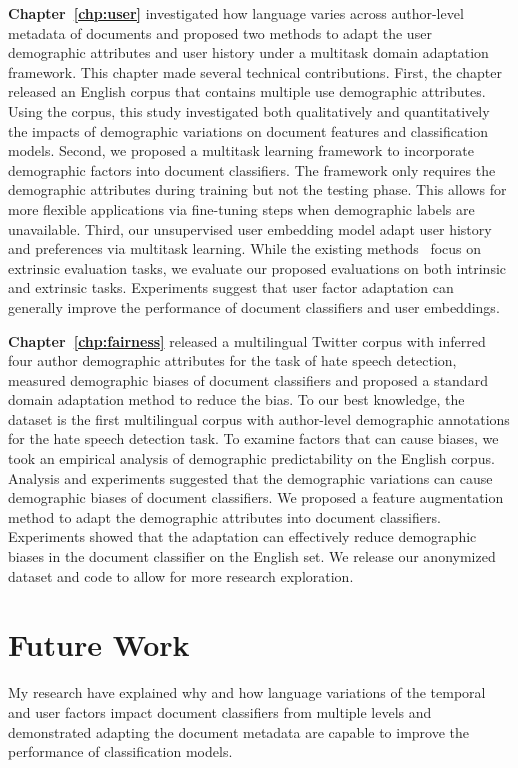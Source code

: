 \textbf{Chapter~\ref{chp:user}} investigated how language varies across author-level metadata of documents and proposed two methods to adapt the user demographic attributes and user history under a multitask domain adaptation framework. This chapter made several technical contributions. First, the chapter released an English corpus that contains multiple use demographic attributes. Using the corpus, this study investigated both qualitatively and quantitatively the impacts of demographic variations on document features and classification models. Second, we proposed a multitask learning framework to incorporate demographic factors into document classifiers. The framework only requires the demographic attributes during training but not the testing phase. This allows for more flexible applications via fine-tuning steps when demographic labels are unavailable. 
Third, our unsupervised user embedding model adapt user history and preferences via multitask learning. While the existing methods~\cite{pan2019social} focus on extrinsic evaluation tasks, we evaluate our proposed evaluations on both intrinsic and extrinsic tasks. 
Experiments suggest that user factor adaptation can generally improve the performance of document classifiers and user embeddings.

\textbf{Chapter~\ref{chp:fairness}} released a multilingual Twitter corpus with inferred four author demographic attributes for the task of hate speech detection, measured demographic biases of document classifiers and proposed a standard domain adaptation method to reduce the bias. To our best knowledge, the dataset is the first multilingual corpus with author-level demographic annotations for the hate speech detection task. To examine factors that can cause biases, we took an empirical analysis of demographic predictability on the English corpus. Analysis and experiments suggested that the demographic variations can cause demographic biases of document classifiers. We proposed a feature augmentation method to adapt the demographic attributes into document classifiers. Experiments showed that the adaptation can effectively reduce demographic biases in the document classifier on the English set. We release our anonymized dataset and code to allow for more research exploration.


\section{Future Work}

My research have explained why and how language variations of the temporal and user factors impact document classifiers from multiple levels and demonstrated adapting the document metadata are capable to improve the performance of classification models.

